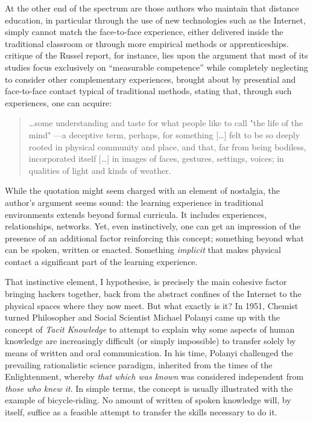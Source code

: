 At the other end of the spectrum are those authors who maintain that distance education, in particular through the use of new technologies such as the Internet, simply cannot match the face-to-face experience, either delivered inside the traditional classroom or through more empirical methods or apprenticeships.  critique of the Russel report, for instance, lies upon the argument that most of its studies focus exclusively on ``measurable competence'' while completely neglecting to consider other complementary experiences, brought about by presential and face-to-face contact typical of traditional methods, stating that, through such experiences, one can acquire:

\begin{quote}
\ldots some understanding and taste for what people like to call "the life of the mind" ---a deceptive term, perhaps, for something [\dots] felt to be so deeply rooted in physical community and place, and that, far from being bodiless, incorporated itself [\ldots] in images of faces, gestures, settings, voices; in qualities of light and kinds of weather.
\end{quote}

While the quotation might seem charged with an element of nostalgia, the author's argument seems sound: the learning experience in traditional environments extends beyond formal curricula. It includes experiences, relationships, networks. Yet, even instinctively, one can get an impression of the presence of an additional factor reinforcing this concept; something beyond what can be spoken, written or enacted. Something \emph{implicit} that makes physical contact a significant part of the learning experience.

That instinctive element, I hypothesise, is precisely the main cohesive factor bringing hackers together, back from the abstract confines of the Internet to the physical spaces where they now meet. But what exactly is it? In 1951, Chemist turned Philosopher and Social Scientist Michael Polanyi came up with the concept of \textit{Tacit Knowledge} to attempt to explain why some aspects of human knowledge are increasingly difficult (or simply impossible) to transfer solely by means of written and oral communication. In his time, Polanyi challenged the prevailing rationalistic science paradigm, inherited from the times of the Enlightenment, whereby \textit{that which was known} was considered independent from \textit{those who knew it}. In simple terms, the concept is usually illustrated with the example of bicycle-riding. No amount of written of spoken knowledge will, by itself, suffice as a feasible attempt to transfer the skills necessary to do it.

